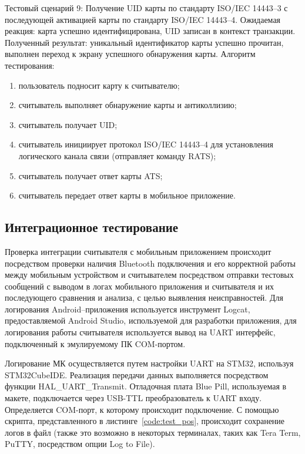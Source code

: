 Тестовый сценарий 9: Получение UID карты по стандарту ISO/IEC 14443--3 с последующей активацией карты по стандарту ISO/IEC 14443--4.
Ожидаемая реакция: карта успешно идентифицирована, UID записан в контекст транзакции.
Полученный результат: уникальный идентификатор карты успешно прочитан, выполнен переход к экрану успешного обнаружения карты.
Алгоритм тестирования:
\begin{enumerate}
	\item пользователь подносит карту к считывателю;
	\item считыватель выполняет обнаружение карты и антиколлизию;
	\item считыватель получает UID;
	\item считыватель инициирует протокол ISO/IEC 14443--4 для установления логического канала связи (отправляет команду RATS);
	\item считыватель получает ответ карты ATS;
	\item считыватель передает ответ карты в мобильное приложение.
\end{enumerate}


\subsection{Интеграционное тестирование}
\label{subsec:test_integr}

Проверка интеграции считывателя с мобильным приложением происходит посредством проверки наличия Bluetooth подключения и его корректной работы между мобильным устройством и считывателем посредством отправки тестовых сообщений с выводом в логах мобильного приложения и считывателя и их последующего сравнения и анализа, с целью выявления неисправностей.
Для логирования Android--приложения используется инструмент Logcat, предоставляемой Android Studio, используемой для разработки приложения, для логирования работы считывателя используется вывод на UART интерфейс, подключенный к эмулируемому ПК COM-портом.

Логирование МК осуществляется путем настройки UART на STM32, используя STM32CubeIDE.
Реализация передачи данных выполняется посредством функции HAL\_UART\_Transmit.
Отладочная плата Blue Pill, используемая в макете, подключается через USB-TTL преобразователь к UART входу.
Определяется COM-порт, к которому происходит подключение.
С помощью скрипта, представленного в листинге~\ref{code:test_pos}, происходит сохранение логов в файл (также это возможно в некоторых терминалах, таких как Tera Term, PuTTY, посредством опции Log to File).

